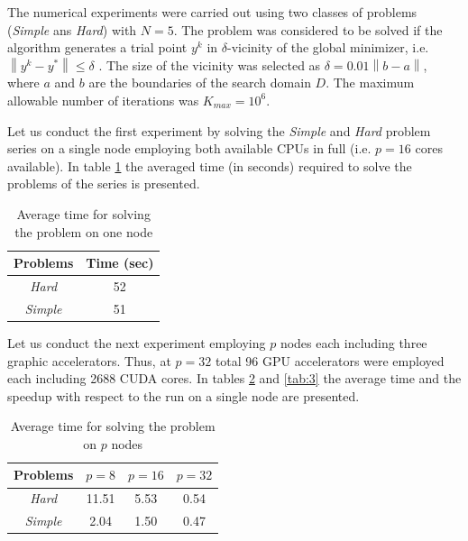 \documentclass[a4paper]{jpconf}
\begin{document}
The numerical experiments were carried out using two classes of problems 
(\textit{Simple} ans \textit{Hard}) with $N=5$. The problem was considered to 
be solved if the algorithm generates a trial point $y^k$ in $\delta$-vicinity 
of the global minimizer, i.e. $\left\|y^k-y^\ast\right\|\leq\delta$ . The 
size of the vicinity was selected as $\delta=0.01\left\|b-a\right\|$, where 
$a$ and $b$ are the boundaries of the search domain $D$. The maximum 
allowable number of iterations was $K_{max} = 10^6$.

Let us conduct the first experiment by solving the \textit{Simple} and \textit{Hard} problem 
series on a single node employing both available CPUs in full (i.e. $p=16$ 
cores available). In table \ref{tab:1} the averaged time (in seconds) 
required to solve the problems of the series is presented.

\begin{table}
\caption{Average time for solving the problem on one node}
\label{tab:1}
\begin{center}
\begin{tabular}{cc}
\hline
Problems & Time (sec) \\
\hline
\textit{Hard} & 52  \\
\textit{Simple} & 51 \\
\hline
\end{tabular}
\end{center}
\end{table}

Let us conduct the next experiment employing $p$ nodes each including three 
graphic accelerators. Thus, at $p=32$ total 96 GPU accelerators were employed 
each including 2688 CUDA cores. In tables \ref{tab:2} and \ref{tab:3} the average time and the speedup with respect to the run 
on a single node are presented.

\begin{table}
\caption{Average time for solving the problem on $p$ nodes}
\label{tab:2}
\begin{center}
\begin{tabular}{cccc}
\hline
Problems & $p = 8$ & $p=16$ & $p=32$ \\
\hline
\textit{Hard} & 11.51 & 5.53 & 0.54 \\
\textit{Simple} & 2.04 & 1.50 & 0.47\\
\hline
\end{tabular}
\end{center}
\end{table}
\end{document}
